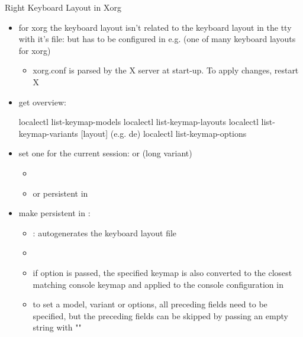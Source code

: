 \begin{frame}{Right Keyboard Layout in Xorg\vspace{0.5cm}}
  \begin{itemize}
    \item for xorg the keyboard layout isn't related to the keyboard layout in the tty with it's file:  but has to be configured in e.g.  (one of many keyboard layouts for xorg)
      \begin{itemize}
        \item xorg.conf is parsed by the X server at start-up. To apply changes, restart X
      \end{itemize}
    \item \alert{get overview:}
      \begin{terminal}[minted language=bash]
        localectl list-keymap-models
        localectl list-keymap-layouts
        localectl list-keymap-variants [layout] (e.g. de)
        localectl list-keymap-options
      \end{terminal}
  \item set one for the current session:  or  (long variant)
    \begin{itemize}
      \item {\tiny {}}
      \item or persistent in 
    \end{itemize}
  \item make persistent in :
    \begin{itemize}
      \item {}: autogenerates the keyboard layout file
      \item {\tiny {}}
      \item if  option is passed, the specified keymap is also converted to the closest matching console keymap and applied to the console configuration in 
      \item to set a model, variant or options, all preceding fields need to be specified, but the preceding fields can be skipped by passing an empty string with ""
    \end{itemize}
  \end{itemize}
\end{frame}

